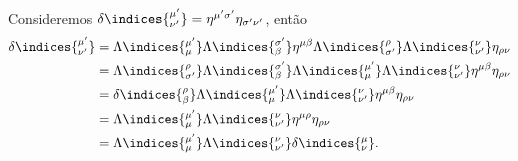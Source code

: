 Consideremos \(\delta\indices{^{\mu'}_{\nu'}} = \eta^{\mu'\sigma'}\eta_{\sigma'\nu'}\), então
\begin{align*}
    \delta\indices{^{\mu'}_{\nu'}} &= \Lambda\indices{^{\mu'}_{\mu}}\Lambda\indices{^{\sigma'}_{\beta}} \eta^{\mu\beta} \Lambda\indices{^{\rho}_{\sigma'}}\Lambda\indices{^\nu_{\nu'}}\eta_{\rho\nu}\\
                                   &= \Lambda\indices{^\rho_{\sigma'}}\Lambda\indices{^{\sigma'}_{\beta}} \Lambda\indices{^{\mu'}_{\mu}} \Lambda\indices{^\nu_{\nu'}} \eta^{\mu \beta} \eta_{\rho \nu}\\
                                   &= \delta\indices{^\rho_\beta} \Lambda\indices{^{\mu'}_{\mu}}\Lambda\indices{^\nu_{\nu'}}\eta^{\mu \beta}\eta_{\rho \nu}\\
                                   &= \Lambda\indices{^{\mu'}_{\mu}}\Lambda\indices{^\nu_{\nu'}}\eta^{\mu \rho}\eta_{\rho \nu}\\
                                   &= \Lambda\indices{^{\mu'}_{\mu}}\Lambda\indices{^\nu_{\nu'}} \delta\indices{^\mu_{\nu}}.
\end{align*}
